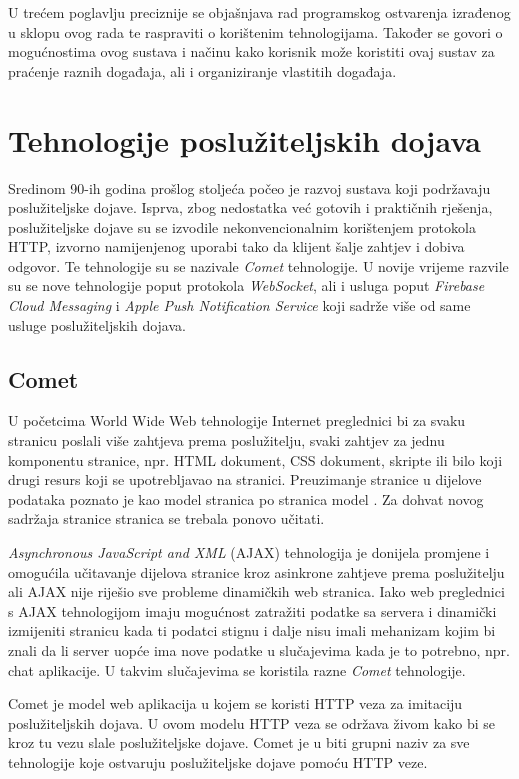 \documentclass[times, utf8, zavrsni]{fer}
\begin{document}
U trećem poglavlju preciznije se objašnjava rad programskog ostvarenja izrađenog u sklopu ovog rada te raspraviti o korištenim tehnologijama. Također se govori o mogućnostima ovog sustava i načinu kako korisnik može koristiti ovaj sustav za praćenje raznih događaja, ali i organiziranje vlastitih događaja.

\chapter{Tehnologije poslužiteljskih dojava}
\label{chp:technologies}

Sredinom 90-ih godina prošlog stoljeća počeo je razvoj sustava koji podržavaju poslužiteljske dojave. Isprva, zbog nedostatka već gotovih i praktičnih rješenja, poslužiteljske dojave su se izvodile nekonvencionalnim korištenjem protokola HTTP, izvorno namijenjenog uporabi tako da klijent šalje zahtjev i dobiva odgovor. Te tehnologije su se nazivale {\em Comet} tehnologije. U novije vrijeme razvile su se nove tehnologije poput protokola {\em WebSocket}, ali i usluga poput {\em Firebase Cloud Messaging} i {\em Apple Push Notification Service} koji sadrže više od same usluge poslužiteljskih dojava.

\section{Comet}
U početcima World Wide Web tehnologije Internet preglednici bi za svaku stranicu poslali više zahtjeva prema poslužitelju, svaki zahtjev za jednu komponentu stranice, npr. HTML dokument, CSS dokument, skripte ili bilo koji drugi resurs koji se upotrebljavao na stranici. Preuzimanje stranice u dijelove podataka poznato je kao model stranica po stranica model . Za dohvat novog sadržaja stranice stranica se trebala ponovo učitati.

{\em Asynchronous JavaScript and XML} (AJAX) tehnologija je donijela promjene i omogućila učitavanje dijelova stranice kroz asinkrone zahtjeve prema poslužitelju ali AJAX nije riješio sve probleme dinamičkih web stranica. Iako web preglednici s AJAX tehnologijom imaju mogućnost zatražiti podatke sa servera i dinamički izmijeniti stranicu kada ti podatci stignu i dalje nisu imali mehanizam kojim bi znali da li server uopće ima nove podatke u slučajevima kada je to potrebno, npr. chat aplikacije. U takvim slučajevima se koristila razne {\em Comet} tehnologije.\citep{gravelle2009comet}

Comet je model web aplikacija u kojem se koristi HTTP veza za imitaciju poslužiteljskih dojava. U ovom modelu HTTP veza se održava živom kako bi se kroz tu vezu slale poslužiteljske dojave. Comet je u biti grupni naziv za sve tehnologije koje ostvaruju poslužiteljske dojave pomoću HTTP veze.
\end{document}
